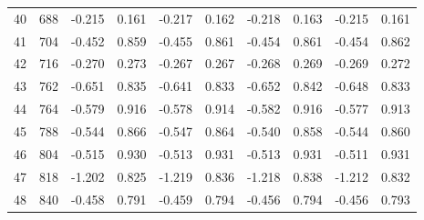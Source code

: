 \documentclass{amsart}
\begin{document}
\begin{longtable}{rrrrrrrrrr}
  40 & 688 & -0.215 & 0.161 & -0.217 & 0.162 & -0.218 & 0.163 & -0.215 & 0.161 \\ 
  41 & 704 & -0.452 & 0.859 & -0.455 & 0.861 & -0.454 & 0.861 & -0.454 & 0.862 \\ 
  42 & 716 & -0.270 & 0.273 & -0.267 & 0.267 & -0.268 & 0.269 & -0.269 & 0.272 \\ 
  43 & 762 & -0.651 & 0.835 & -0.641 & 0.833 & -0.652 & 0.842 & -0.648 & 0.833 \\ 
  44 & 764 & -0.579 & 0.916 & -0.578 & 0.914 & -0.582 & 0.916 & -0.577 & 0.913 \\ 
  45 & 788 & -0.544 & 0.866 & -0.547 & 0.864 & -0.540 & 0.858 & -0.544 & 0.860 \\ 
  46 & 804 & -0.515 & 0.930 & -0.513 & 0.931 & -0.513 & 0.931 & -0.511 & 0.931 \\ 
  47 & 818 & -1.202 & 0.825 & -1.219 & 0.836 & -1.218 & 0.838 & -1.212 & 0.832 \\ 
  48 & 840 & -0.458 & 0.791 & -0.459 & 0.794 & -0.456 & 0.794 & -0.456 & 0.793 \\ 
   \hline
\hline
\end{longtable}
\end{document}
